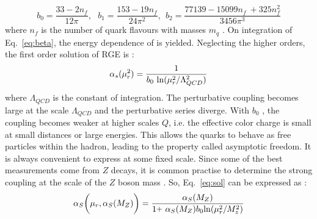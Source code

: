 \begin{equation}
b_0 = \frac{33-2n_f}{12\pi}, ~~~b_1 = \frac{153-19n_f}{24\pi^2}, ~~b_2 = \frac{77139 - 15099n_f~\plus 325n^2_f}{3456\pi^3}
\end{equation}
where $n_f$ is the number of quark flavours with masses $m_q$ \ls \mur. On integration of Eq.~\ref{eq:beta}, the energy dependence of \alps is yielded. Neglecting the higher orders, the first order solution of RGE is :
\begin{equation}
\alpha_{s}(\mur^2)=\frac{1}{b_0~{\rm ln}(\mur^2/\Lambda^2_{QCD})}
\label{eq:sol}
\end{equation}
where $\Lambda_{QCD}$ is the constant of integration. The perturbative coupling becomes large at the scale $\Lambda_{QCD}$ and the perturbative series diverge. With $b_0$ , the coupling becomes weaker at higher scales $Q$, i.e. the effective color charge is small at small distances or large energies. This allows the quarks to behave as free particles within the hadron, leading to the property called asymptotic freedom. It is always convenient to express \alps at some fixed scale. Since some of the best measurements come from $Z$ decays, it is common practise to determine the strong coupling at the scale of the $Z$ boson mass \alpsmz. So, Eq.~\ref{eq:sol} can be expressed as :
\begin{equation}
\alps\bigg(\mur,\alpsmz\bigg) = \frac{\alpsmz}{1\plus\alpsmz b_0{\rm ln}(\mur^2/M^2_z)}
\end{equation}

